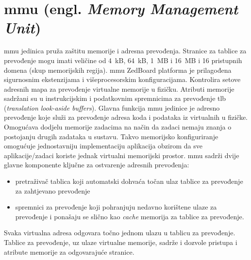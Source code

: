 \documentclass[times, utf8, diplomski, numeric]{fer}
\begin{document}
\section{\gls{mmu} (engl. \textit{Memory Management Unit})}
\gls{mmu} jedinica pruža zaštitu memorije i adresna prevođenja. Stranice za tablice za prevođenje mogu imati veličine od 4~kB,
64~kB, 1~MB i 16~MB i 16 pristupnih domena (skup memorijskih regija). \gls{mmu} ZedBoard platforma je prilagođena sigurnosnim
ekstenzijama i višeprocesorskim konfiguracijama. Kontrolira setove adresnih mapa za prevođenje virtualne memorije u fizičku.
Atributi memorije sadržani su u instrukcijskim i podatkovnim spremnicima za prevođenje \gls{tlb} (\textit{translation look-aside
buffers}). Glavna funkcija \gls{mmu} jedinice je adresno prevođenje koje služi za prevođenje adresa koda i podataka iz virtualnih u
fizičke. Omogućava dodjelu memorije zadacima na način da zadaci nemaju znanja o postojanju drugih zadataka u sustavu. Takvo
memorijsko konfiguriranje omogućuje jednostavniju implementaciju aplikacija obzirom da sve aplikacije/zadaci koriste jednak
virtualni memorijski prostor. \gls{mmu} sadrži dvije glavne komponente ključne za ostvarenje adresnih prevođenja:
\begin{itemize}
  \item{pretraživač tablica koji automatski dohvaća točan ulaz tablice za prevođenje za zahtjevano prevođenje}
  \item{spremnici za prevođenje koji pohranjuju nedavno korištene ulaze za prevođenje i ponašaju se slično kao \textit{cache}
  memorija za tablice za prevođenje.}
\end{itemize}
Svaka virtualna adresa odgovara točno jednom ulazu u tablicu za prevođenje. Tablice za prevođenje, uz ulaze virtualne memorije,
sadrže i dozvole pristupa i atribute memorije za odgovarajuće stranice.
\end{document}
